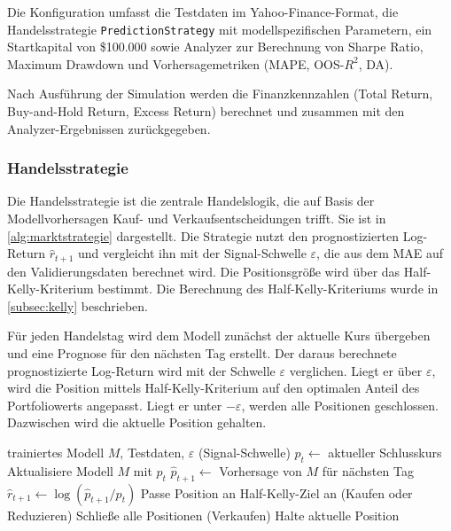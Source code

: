 Die Konfiguration umfasst die Testdaten im Yahoo-Finance-Format, die Handelsstrategie \texttt{PredictionStrategy} mit modellspezifischen Parametern, ein Startkapital von \$100.000 sowie Analyzer zur Berechnung von Sharpe Ratio, Maximum Drawdown und Vorhersagemetriken (MAPE, OOS-$R^2$, DA).

Nach Ausführung der Simulation werden die Finanzkennzahlen (Total Return, Buy-and-Hold Return, Excess Return) berechnet und zusammen mit den Analyzer-Ergebnissen zurückgegeben.

\subsubsection{Handelsstrategie}\label{subsubsec:marktstrategie}
Die Handelsstrategie ist die zentrale Handelslogik, die auf Basis der Modellvorhersagen Kauf- und Verkaufsentscheidungen trifft. Sie ist in \cref{alg:marktstrategie} dargestellt. Die Strategie nutzt den prognostizierten Log-Return $\hat{r}_{t+1}$ und vergleicht ihn mit der Signal-Schwelle $\varepsilon$, die aus dem \ac{MAE} auf den Validierungsdaten berechnet wird. Die Positionsgröße wird über das Half-Kelly-Kriterium bestimmt. Die Berechnung des Half-Kelly-Kriteriums wurde in \cref{subsec:kelly} beschrieben.

Für jeden Handelstag wird dem Modell zunächst der aktuelle Kurs übergeben und eine Prognose für den nächsten Tag erstellt. Der daraus berechnete prognostizierte Log-Return wird mit der Schwelle $\varepsilon$ verglichen. Liegt er über $\varepsilon$, wird die Position mittels Half-Kelly-Kriterium auf den optimalen Anteil des Portfoliowerts angepasst. Liegt er unter $-\varepsilon$, werden alle Positionen geschlossen. Dazwischen wird die aktuelle Position gehalten.
\begin{algorithm}
    \caption{PredictionStrategy -- Handelsstrategie}\label{alg:marktstrategie}
    \small
    \begin{algorithmic}[1]
        \Require trainiertes Modell $M$, Testdaten, $\varepsilon$ (Signal-Schwelle)
        \State $p_t \gets$ aktueller Schlusskurs
        \State Aktualisiere Modell $M$ mit $p_t$
        \State $\hat{p}_{t+1} \gets$ Vorhersage von $M$ für nächsten Tag
        \State $\hat{r}_{t+1} \gets \log(\hat{p}_{t+1} / p_t)$
        \State Passe Position an Half-Kelly-Ziel an (Kaufen oder Reduzieren)
        \State Schließe alle Positionen (Verkaufen)
        \Else
        \State Halte aktuelle Position
        \EndIf
        \EndFor
    \end{algorithmic}
\end{algorithm}
